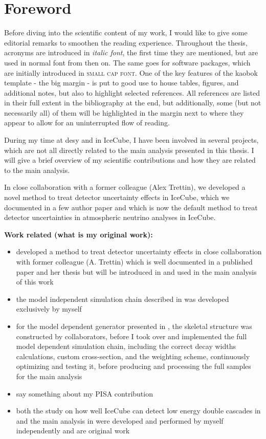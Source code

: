 \chapter*{Foreword}

Before diving into the scientific content of my work, I would like to give some editorial remarks to smoothen the reading experience. Throughout the thesis, acronyms are introduced in \textit{italic font}, the first time they are mentioned, but are used in normal font from then on. The same goes for software packages, which are initially introduced in \textsc{small cap font}. One of the key features of the kaobok template - the big margin - is put to good use to house tables, figures, and additional notes, but also to highlight selected references. All references are listed in their full extent in the bibliography at the end, but additionally, some (but not necessarily all) of them will be highlighted in the margin next to where they appear to allow for an uninterrupted flow of reading.

During my time at desy and in IceCube, I have been involved in several projects, which are not all directly related to the main analysis presented in this thesis. I will give a brief overview of my scientific contributions and how they are related to the main analysis.

In close collaboration with a former colleague (Alex Trettin), we developed a novel method to treat detector uncertainty effects in IceCube, which we documented in a few author paper and which is now the default method to treat detector uncertainties in atmospheric neutrino analyses in IceCube.


\textbf{Work related (what is my original work):}
\begin{itemize}
    \item developed a method to treat detector uncertainty effects in close collaboration with former colleague (A. Trettin) which is well documented in a published paper and her thesis but will be introduced in  and used in the main analysis of this work
    \item the model independent simulation chain described in  was developed exclusively by myself
    \item for the model dependent generator presented in , the skeletal structure was constructed by collaborators, before I took over and implemented the full model dependent simulation chain, including the correct decay widths calculations, custom cross-section, and the weighting scheme, continuously optimizing and testing it, before producing and processing the full samples for the main analysis
    \item say something about my PISA contribution
    \item both the study on how well IceCube can detect low energy double cascades in  and the main analysis in  were developed and performed by myself independently and are original work
\end{itemize}


